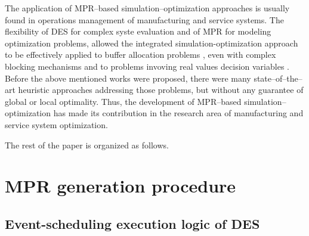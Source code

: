 \documentclass[]{interact}
\theoremstyle{plain}%
\theoremstyle{definition}
\theoremstyle{remark}
\begin{document}
The application of MPR--based simulation--optimization approaches is usually found in operations management of manufacturing and service systems. %
The flexibility of DES for complex syste evaluation and of MPR for modeling optimization problems, allowed the integrated simulation-optimization approach to be effectively applied to buffer allocation problems \citep{zhang2020BAP}, even with complex blocking mechanisms \citep{pedrielli2015integrated} and to problems invoving real values decision variables \citep{tan2015mathematical,zhang2020models}. 
Before the above mentioned works were proposed, there were many state--of--the--art heuristic approaches addressing those problems, but without any guarantee of global or local optimality. Thus, the development of MPR--based simulation--optimization has made its contribution in the research area of manufacturing and service system optimization.


The rest of the paper is organized as follows. 

\section{MPR generation procedure}
\subsection{Event-scheduling execution logic of DES } \label{sec:SimAlgo}
\end{document}
